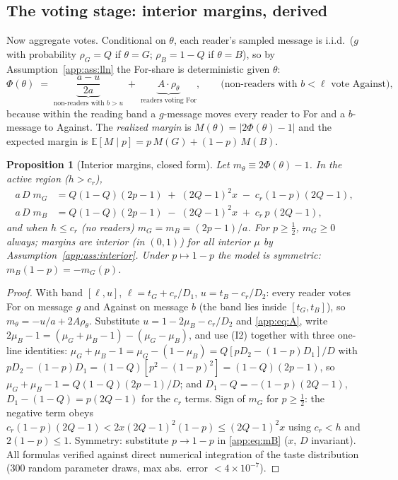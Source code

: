 \documentclass[12pt]{article}
\newtheorem{proposition}{Proposition}
\newcommand{\E}{\mathbb{E}}
\begin{document}
\subsection{The voting stage: interior margins, derived}
\label{app:sec:margin}

Now aggregate votes. Conditional on $\theta$, each reader's sampled message is
i.i.d.\ ($g$ with probability $\rho_G=Q$ if $\theta=G$; $\rho_B=1-Q$ if
$\theta=B$), so by Assumption~\ref{app:ass:lln} the For-share is deterministic given
$\theta$:
\[
\Phi(\theta)\;=\;\underbrace{\frac{a-u}{2a}}_{\text{non-readers with }b>u}
\;+\;\underbrace{A\cdot\rho_\theta}_{\text{readers voting For}},
\qquad\text{(non-readers with }b<\ell\text{ vote Against),}
\]
because within the reading band a $g$-message moves every reader to For and a
$b$-message to Against. The \emph{realized margin} is
$M(\theta)=|2\Phi(\theta)-1|$ and the expected margin is
$\E[M\mid p]=p\,M(G)+(1-p)\,M(B)$.

\begin{proposition}[Interior margins, closed form]\label{app:prop:margin}
Let $m_\theta\equiv2\Phi(\theta)-1$. In the active region ($h>c_r$),
\begin{align}
a\,D\;m_G&=Q(1-Q)(2p-1)\;+\;(2Q-1)^2x\;-\;c_r(1-p)(2Q-1),\label{app:eq:mG}\\
a\,D\;m_B&=Q(1-Q)(2p-1)\;-\;(2Q-1)^2x\;+\;c_r\,p\,(2Q-1),\label{app:eq:mB}
\end{align}
and when $h\le c_r$ (no readers) $m_G=m_B=(2p-1)/a$. For $p\ge\tfrac12$,
$m_G\ge0$ always; margins are interior (in $(0,1)$) for all interior $\mu$ by
Assumption~\ref{app:ass:interior}. Under $p\mapsto1-p$ the model is symmetric:
$m_B(1-p)=-m_G(p)$.
\end{proposition}

\begin{proof}
With band $[\ell,u]$, $\ell=t_G+c_r/D_1$, $u=t_B-c_r/D_2$: every reader votes
For on message $g$ and Against on message $b$ (the band lies inside
$[t_G,t_B]$), so $m_\theta=-u/a+2A\rho_\theta$. Substitute
$u=1-2\mu_B-c_r/D_2$ and \eqref{app:eq:A}, write
$2\mu_B-1=(\mu_G+\mu_B-1)-(\mu_G-\mu_B)$, and use (I2) together with three
one-line identities: $\mu_G+\mu_B-1=\mu_G-(1-\mu_B)=Q[pD_2-(1-p)D_1]/D$ with
$pD_2-(1-p)D_1=(1-Q)[p^2-(1-p)^2]=(1-Q)(2p-1)$, so
$\mu_G+\mu_B-1=Q(1-Q)(2p-1)/D$; and $D_1-Q=-(1-p)(2Q-1)$,
$D_1-(1-Q)=p(2Q-1)$ for the $c_r$ terms.
Sign of $m_G$ for $p\ge\tfrac12$: the negative term obeys
$c_r(1-p)(2Q-1)<2x(2Q-1)^2(1-p)\le(2Q-1)^2x$ using $c_r<h$ and $2(1-p)\le1$.
Symmetry: substitute $p\to1-p$ in \eqref{app:eq:mB} ($x$, $D$ invariant).
All formulas verified against direct numerical integration of the taste
distribution (300 random parameter draws, max abs.\ error $<4\times10^{-7}$).
\end{proof}
\end{document}
